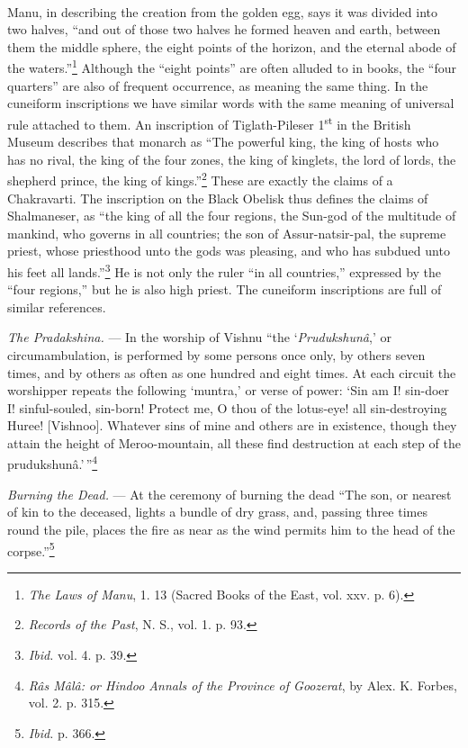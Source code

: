 \documentclass[a4paper, 11pt, oneside, polutonikogreek, english]{article}
\begin{document}
\paragraph{}
Manu, in describing the creation from the golden egg, says it was divided into two halves, ``and out of those two halves he formed heaven and earth, between them the middle sphere, the eight points of the horizon, and the eternal abode of the waters.''\footnote{\emph{The Laws of Manu}, 1. 13 (Sacred Books of the East, vol. xxv. p. 6).} Although the ``eight points'' are often alluded to in books, the ``four quarters'' are also of frequent occurrence, as meaning the same thing. In the cuneiform inscriptions we have similar words with the same meaning of universal rule attached to them. An inscription of Tiglath-Pileser 1\textsuperscript{st} in the British Museum describes that monarch as ``The powerful king, the king of hosts who has no rival, the king of the four zones, the king of kinglets, the lord of lords, the shepherd prince, the king of kings.''\footnote{\emph{Records of the Past}, N. S., vol. 1. p. 93.} These are exactly the claims of a Chakravarti. The inscription on the Black Obelisk thus defines the claims of Shalmaneser, as ``the king of all the four regions, the Sun-god of the multitude of mankind, who governs in all countries; the son of Assur-natsir-pal, the supreme priest, whose priesthood unto the gods was pleasing, and who has subdued unto his feet all lands.''\footnote{\emph{Ibid.} vol. 4. p. 39.} He is not only the ruler ``in all countries,'' expressed by the ``four regions,'' but he is also high priest. The cuneiform inscriptions are full of similar references.

\emph{The Pradakshina.} --- In the worship of Vishnu ``the `\emph{Prudukshunâ},' or circumambulation, is performed by some persons once only, by others seven times, and by others as often as one hundred and eight times. At each circuit the worshipper repeats the following `muntra,' or verse of power: `Sin am I! sin-doer I! sinful-souled, sin-born! Protect me, O thou of the lotus-eye! all sin-destroying Huree! [Vishnoo]. Whatever sins of mine and others are in existence, though they attain the height of Meroo-mountain, all these find destruction at each step of the prudukshunâ.'\,''\footnote{\emph{Râs Mâlâ: or Hindoo Annals of the Province of Goozerat}, by Alex. K. Forbes, vol. 2. p. 315.}

\emph{Burning the Dead.} --- At the ceremony of burning the dead ``The son, or nearest of kin to the deceased, lights a bundle of dry grass, and, passing three times round the pile, places the fire as near as the wind permits him to the head of the corpse.''\footnote{\emph{Ibid.} p. 366.}
\end{document}

